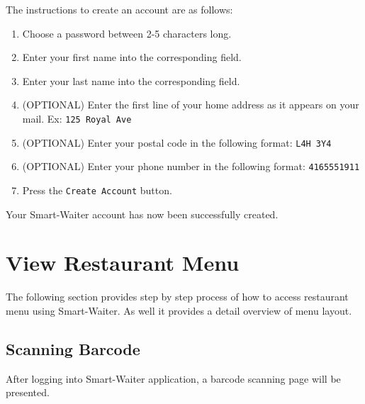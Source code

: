 \documentclass[12pt, titlepage]{article}
\begin{document}
The instructions to create an account are as follows: 
\begin{enumerate}
	\item Choose a password between 2-5 characters long.
	\item Enter your first name into the corresponding field.
	\item Enter your last name into the corresponding field.
	\item (OPTIONAL) Enter the first line of your home address as it appears on your mail. Ex: \texttt{125 Royal Ave}
	\item (OPTIONAL) Enter your postal code in the following format: \texttt{L4H 3Y4}
	\item (OPTIONAL) Enter your phone number in the following format: \texttt{4165551911}
	\item Press the \texttt{Create Account} button.
\end{enumerate}

Your Smart-Waiter account has now been successfully created.
\section{View Restaurant Menu}
The following section provides step by step process of how to access restaurant menu using Smart-Waiter. As well it provides a detail overview of menu layout.
\subsection{Scanning Barcode}
After logging into Smart-Waiter application, a barcode scanning page will be presented.
\end{document}

